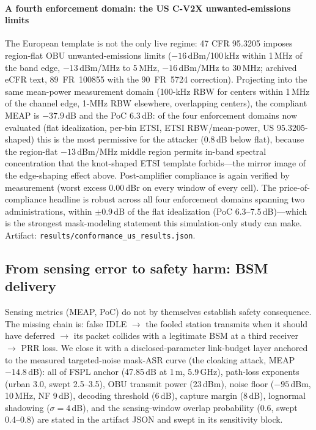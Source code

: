\documentclass[review]{elsarticle}
\begin{document}
\paragraph{A fourth enforcement domain: the US C-V2X unwanted-emissions
limits}
\label{par:usdomain}
The European template is not the only live regime: 47 CFR 95.3205
imposes region-flat OBU unwanted-emissions limits ($-16$\,dBm/100\,kHz
within 1\,MHz of the band edge, $-13$\,dBm/MHz to 5\,MHz,
$-16$\,dBm/MHz to 30\,MHz; archived eCFR text, 89~FR~100855 with the
90~FR~5724 correction). Projecting into the same mean-power measurement
domain (100-kHz RBW for centers within 1\,MHz of the channel edge,
1-MHz RBW elsewhere, overlapping centers), the compliant MEAP is
$-37.9$\,dB and the PoC $6.3$\,dB: of the four enforcement domains now
evaluated (flat idealization, per-bin ETSI, ETSI RBW/mean-power, US
95.3205-shaped) this is the most permissive for the attacker ($0.8$\,dB
below flat), because the region-flat $-13$\,dBm/MHz middle region
permits in-band spectral concentration that the knot-shaped ETSI
template forbids---the mirror image of the edge-shaping effect above.
Post-amplifier compliance is again verified by measurement (worst
excess $0.00$\,dBr on every window of every cell). The
price-of-compliance headline is robust across all four enforcement
domains spanning two administrations, within $\pm$0.9\,dB of the flat
idealization (PoC 6.3--7.5\,dB)---which is the strongest mask-modeling
statement this simulation-only study can make. Artifact:
\texttt{results/conformance\_us\_results.json}.

\subsection{From sensing error to safety harm: BSM delivery}
\label{sec:harm}

Sensing metrics (MEAP, PoC) do not by themselves establish safety
consequence. The missing chain is: false IDLE $\rightarrow$ the fooled
station transmits when it should have deferred $\rightarrow$ its packet
collides with a legitimate BSM at a third receiver $\rightarrow$ PRR
loss. We close it with a disclosed-parameter link-budget layer anchored
to the measured targeted-noise mask-ASR curve (the cloaking attack,
MEAP $-14.8$\,dB): all of FSPL anchor (47.85\,dB at 1\,m, 5.9\,GHz),
path-loss exponents (urban 3.0, swept 2.5--3.5), OBU transmit power
(23\,dBm), noise floor ($-95$\,dBm, 10\,MHz, NF 9\,dB), decoding
threshold (6\,dB), capture margin (8\,dB), lognormal shadowing
($\sigma=4$\,dB), and the sensing-window overlap probability (0.6,
swept 0.4--0.8) are stated in the artifact JSON and swept in its
sensitivity block.
\end{document}
